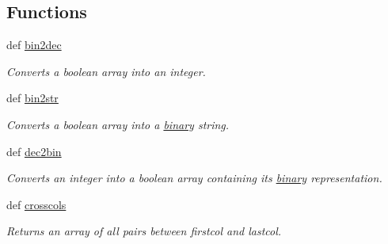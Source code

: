 \subsection*{Functions}
\begin{CompactItemize}
\item 
def \hyperlink{namespacegen_6b7ade8b5daf3fe3773bbd616e9e2b42}{bin2dec}
\begin{CompactList}\small\item\em Converts a boolean array into an integer. \item\end{CompactList}\item 
def \hyperlink{namespacegen_21553f88e5b189da2003268cfabb215f}{bin2str}
\begin{CompactList}\small\item\em Converts a boolean array into a \hyperlink{classgen_1_1binary}{binary} string. \item\end{CompactList}\item 
def \hyperlink{namespacegen_804c568d405e9b3b8234ca18666fd0e3}{dec2bin}
\begin{CompactList}\small\item\em Converts an integer into a boolean array containing its \hyperlink{classgen_1_1binary}{binary} representation. \item\end{CompactList}\item 
def \hyperlink{namespacegen_287d3a33d4580585adcc84c10c39082a}{crosscols}
\begin{CompactList}\small\item\em Returns an array of all pairs between firstcol and lastcol. \item\end{CompactList}\end{CompactItemize}
